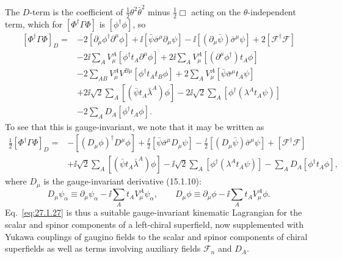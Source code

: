 The \(D\)-term is the coefficient of
\(\tfrac12\theta^2\bar\theta^2\) minus \(\tfrac12\Box\) acting
on the \(\theta\)-independent term, which for
\([\Phi^\dagger\Gamma\Phi]\) is \([\phi^\dagger\phi]\), so
\[
  \begin{aligned}
  [\Phi^\dagger\Gamma\Phi]_D={}&
  -2[\partial_\mu\phi^\dagger\partial^\mu\phi]
  +\ii[\bar\psi\bar\sigma^\mu\partial_\mu\psi]
  -\ii[(\partial_\mu\bar\psi)\bar\sigma^\mu\psi]
  +2[\mathcal{F}^\dagger\mathcal{F}]
  \\
  &-2\ii\sum_A V^A_\mu[\phi^\dagger t_A\partial^\mu\phi]
  +2\ii\sum_A V^A_\mu[(\partial^\mu\phi^\dagger)t_A\phi]
  \\
  &-2\sum_{AB}V^A_\mu V^{B\mu}
    [\phi^\dagger t_At_B\phi]
  +2\sum_A V^A_\mu[\bar\psi\bar\sigma^\mu t_A\psi]
  \\
  &+2\ii\sqrt{2}\sum_A[(\bar\psi t_A\bar\lambda^A)\phi]
  -2\ii\sqrt{2}\sum_A[\phi^\dagger(\lambda^At_A\psi)]
  \\
  &-2\sum_A D_A[\phi^\dagger t_A\phi].
  \end{aligned}
\]
To see that this is gauge-invariant, we note that it may be written as
\begin{equation}
  \begin{aligned}
  \frac12[\Phi^\dagger\Gamma\Phi]_D={}&
  -[(D_\mu\phi)^\dagger D^\mu\phi]
  +\frac{\ii}{2}[\bar\psi\bar\sigma^\mu D_\mu\psi]
  -\frac{\ii}{2}[(D_\mu\bar\psi)\bar\sigma^\mu\psi]
  +[\mathcal{F}^\dagger\mathcal{F}]
  \\
  &+\ii\sqrt{2}\sum_A[(\bar\psi t_A\bar\lambda^A)\phi]
  -\ii\sqrt{2}\sum_A[\phi^\dagger(\lambda^At_A\psi)]
  -\sum_A D_A[\phi^\dagger t_A\phi],
  \end{aligned}
  \tag{27.1.27}\label{eq:27.1.27}
\end{equation}
where \(D_\mu\) is the gauge-invariant derivative (15.1.10):
\begin{equation}
  D_\mu\psi_\alpha\equiv
  \partial_\mu\psi_\alpha-\ii\sum_A t_AV^A_\mu\psi_\alpha,
  \qquad
  D_\mu\phi\equiv
  \partial_\mu\phi-\ii\sum_A t_AV^A_\mu\phi.
  \tag{27.1.28}\label{eq:27.1.28}
\end{equation}
Eq.~\eqref{eq:27.1.27} is thus a suitable gauge-invariant kinematic
Lagrangian for the scalar and spinor components of a left-chiral
superfield, now supplemented with Yukawa couplings of gaugino fields to
the scalar and spinor components of chiral superfields as well as terms
involving auxiliary fields \(\mathcal{F}_n\) and \(D_A\).
